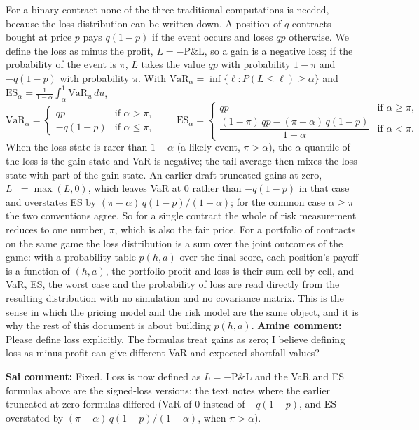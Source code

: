 \documentclass[11pt]{article}
\begin{document}
For a binary contract none of the three traditional computations is needed, because the loss distribution can be written down. A position of $q$ contracts bought at price $p$ pays $q(1-p)$ if the event occurs and loses $qp$ otherwise. We define the loss as minus the profit, $L = -\text{P\&L}$, so a gain is a negative loss; if the probability of the event is $\pi$, $L$ takes the value $qp$ with probability $1-\pi$ and $-q(1-p)$ with probability $\pi$. With $\mathrm{VaR}_\alpha = \inf\{\ell : P(L\le \ell)\ge\alpha\}$ and $\mathrm{ES}_\alpha = \frac{1}{1-\alpha}\int_\alpha^1 \mathrm{VaR}_u\,du$,
\[
\mathrm{VaR}_\alpha = \begin{cases} qp & \text{if } \alpha > \pi,\\ -q(1-p) & \text{if } \alpha \le \pi,\end{cases}
\qquad
\mathrm{ES}_\alpha = \begin{cases} qp & \text{if } \alpha \ge \pi,\\[2pt] \dfrac{(1-\pi)\,qp - (\pi-\alpha)\,q(1-p)}{1-\alpha} & \text{if } \alpha < \pi.\end{cases}
\]
When the loss state is rarer than $1-\alpha$ (a likely event, $\pi>\alpha$), the $\alpha$-quantile of the loss is the gain state and VaR is negative; the tail average then mixes the loss state with part of the gain state. An earlier draft truncated gains at zero, $L^+=\max(L,0)$, which leaves VaR at $0$ rather than $-q(1-p)$ in that case and overstates ES by $(\pi-\alpha)\,q(1-p)/(1-\alpha)$; for the common case $\alpha\ge\pi$ the two conventions agree. So for a single contract the whole of risk measurement reduces to one number, $\pi$, which is also the fair price. For a portfolio of contracts on the same game the loss distribution is a sum over the joint outcomes of the game: with a probability table $p(h,a)$ over the final score, each position's payoff is a function of $(h,a)$, the portfolio profit and loss is their sum cell by cell, and VaR, ES, the worst case and the probability of loss are read directly from the resulting distribution with no simulation and no covariance matrix. This is the sense in which the pricing model and the risk model are the same object, and it is why the rest of this document is about building $p(h,a)$.
{\color{red}\textbf{Amine comment:} Please define loss explicitly. The formulas treat gains as zero; I believe defining loss as minus profit can give different VaR and expected shortfall values?}

{\color{blue}\textbf{Sai comment:} Fixed. Loss is now defined as $L=-\text{P\&L}$ and the VaR and ES formulas above are the signed-loss versions; the text notes where the earlier truncated-at-zero formulas differed (VaR of $0$ instead of $-q(1-p)$, and ES overstated by $(\pi-\alpha)\,q(1-p)/(1-\alpha)$, when $\pi>\alpha$).}
\end{document}
